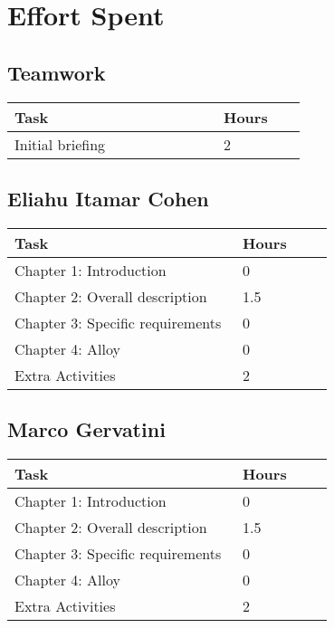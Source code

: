 \chapter{Effort Spent}

\section{Teamwork}
\begin{center}
    \begin{tabular}{@{}p{0.5\linewidth} p{0.2\linewidth}@{}}
        \hline
        \textbf{Task} & \textbf{Hours} \\ \hline
        Initial briefing & 2 \\ \hline
    \end{tabular}
\end{center}

\section{Eliahu Itamar Cohen}
\begin{center}
    \begin{tabular}{@{}p{0.5\linewidth} p{0.2\linewidth}@{}}
        \hline
        \textbf{Task} & \textbf{Hours} \\ \hline
        Chapter 1: Introduction & 0 \\ \hline
        Chapter 2: Overall description & 1.5 \\ \hline
        Chapter 3: Specific requirements & 0 \\ \hline
        Chapter 4: Alloy & 0 \\ \hline
        Extra Activities & 2 \\ \hline
    \end{tabular}
\end{center}

\section{Marco Gervatini}
\begin{center}
	\begin{tabular}{@{}p{0.5\linewidth} p{0.2\linewidth}@{}}
		\hline
		\textbf{Task} & \textbf{Hours} \\ \hline
            Chapter 1: Introduction & 0 \\ \hline
            Chapter 2: Overall description & 1.5 \\ \hline
            Chapter 3: Specific requirements & 0 \\ \hline
            Chapter 4: Alloy & 0 \\ \hline
	    Extra Activities & 2 \\ \hline
	\end{tabular}
\end{center}

